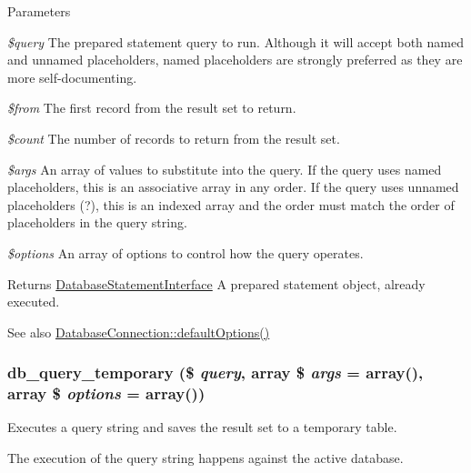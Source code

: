 \begin{DoxyParams}{Parameters}
\item[{\em \$query}]The prepared statement query to run. Although it will accept both named and unnamed placeholders, named placeholders are strongly preferred as they are more self-\/documenting. \item[{\em \$from}]The first record from the result set to return. \item[{\em \$count}]The number of records to return from the result set. \item[{\em \$args}]An array of values to substitute into the query. If the query uses named placeholders, this is an associative array in any order. If the query uses unnamed placeholders (?), this is an indexed array and the order must match the order of placeholders in the query string. \item[{\em \$options}]An array of options to control how the query operates.\end{DoxyParams}
\begin{DoxyReturn}{Returns}
\hyperlink{interfaceDatabaseStatementInterface}{DatabaseStatementInterface} A prepared statement object, already executed.
\end{DoxyReturn}
\begin{DoxySeeAlso}{See also}
\hyperlink{classDatabaseConnection_a190539d6c494ef2d7ac90d21226de5a5}{DatabaseConnection::defaultOptions()} 
\end{DoxySeeAlso}
\hypertarget{group__database_gaac717e09516a8acb0ff82b3a990c13a6}{
\subsubsection[{db\_\-query\_\-temporary}]{\setlength{\rightskip}{0pt plus 5cm}db\_\-query\_\-temporary (\$ {\em query}, \/  array \$ {\em args} = {\ttfamily array()}, \/  array \$ {\em options} = {\ttfamily array()})}}
\label{group__database_gaac717e09516a8acb0ff82b3a990c13a6}
Executes a query string and saves the result set to a temporary table.

The execution of the query string happens against the active database.


